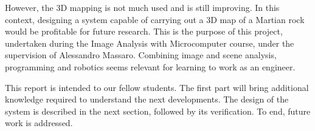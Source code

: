 However, the 3D mapping is not much used and is still improving. In this context, designing a system capable of carrying out a 3D map of a Martian rock would be profitable for future research. This is the purpose of this project, undertaken during the Image Analysis with Microcomputer course, under the supervision of Alessandro Massaro. Combining image and scene analysis, programming and robotics seems relevant for learning to work as an engineer.

This report is intended to our fellow students. The first part will bring additional knowledge required to understand the next developments. The design of the system is described in the next section, followed by its verification. To end, future work is addressed.